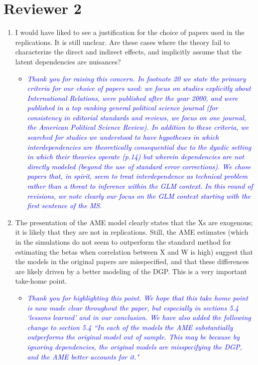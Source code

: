 \section*{Reviewer 2}

\begin{enumerate}
	\item I would have liked to see a justification for the choice of papers used in the replications. It is still unclear. Are these cases where the theory fail to characterize the direct and indirect effects, and implicitly assume that the latent dependencies are nuisances?
	\begin{itemize}
		\item \textcolor{blue}{ \emph{
		Thank you for raising this concern. In footnote 20 we state the primary criteria for our choice of papers used: we focus on studies explicitly about International Relations, were published after the year 2000, and were published in a top ranking general political science journal (for consistency in editorial standards and reviews, we focus on one journal, the American Political Science Review). In addition to these criteria, we searched for studies we understood to have hypotheses in which interdependencies are theoretically consequential due to the dyadic setting in which their theories operate (p.14) but wherein dependencies are not directly modeled (beyond the use of standard error corrections). We chose papers that, in spirit, seem to treat interdependence as technical problem rather than a threat to inference within the GLM context. In this round of revisions, we note clearly our focus on the GLM context starting with the first sentence of the MS.}}
	\end{itemize}
	\item The presentation of the AME model clearly states that the Xs are exogenous; it is likely that they are not in replications. Still, the AME estimates (which in the simulations do not seem to outperform the standard method for estimating the betas when correlation between X and W is high) suggest that the models in the original papers are misspecified, and that these differences are likely driven by a better modeling of the DGP. This is a very important take-home point.
	\begin{itemize}
		\item \textcolor{blue}{ \emph{
			Thank you for highlighting this point. We hope that this take home point is now made clear throughout the paper, but especially in sections 5.4 `lessons learned' and in our conclusion. We have also added the following change to section 5.4 ``In each of the models the AME substantially outperforms the original model out of sample. This may be because by ignoring dependencies, the original models are misspecifying the DGP, and the AME better accounts for it."
			}}
	\end{itemize}
\end{enumerate}